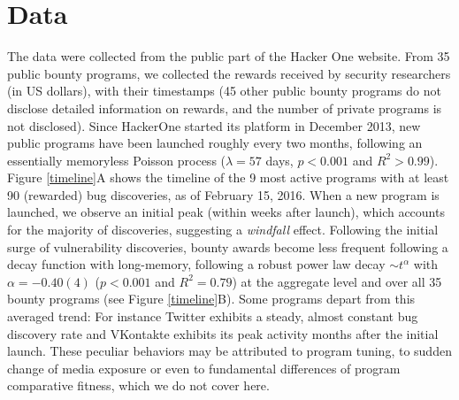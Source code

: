 \section{Data}
\label{sec:data}
The data were collected from the public part of the Hacker One website. From 35 public bounty programs, we collected the rewards received by security researchers (in US dollars), with their timestamps (45 other public bounty programs do not disclose detailed information on rewards, and the number of private programs is not disclosed). Since HackerOne started its platform in December 2013, new public programs have been launched roughly every two months, following an essentially memoryless Poisson process ($\lambda = 57$ days, $p < 0.001$ and $R^2 > 0.99$). Figure \ref{timeline}A shows the timeline of the 9 most active programs with at least 90 (rewarded) bug discoveries, as of February 15, 2016. When a new program is launched, we observe an initial peak (within weeks after launch), which accounts for the majority of discoveries, suggesting a {\it windfall} effect. Following the initial surge of vulnerability discoveries, bounty awards become less frequent following a decay function with long-memory, following a robust power law decay $\sim t^{\alpha}$ with $\alpha = -0.40(4)$ ($p < 0.001$ and $R^2 = 0.79$) at the aggregate level and over all 35 bounty programs (see Figure \ref{timeline}B). Some programs depart from this averaged trend: For instance Twitter exhibits a steady, almost constant bug discovery rate and VKontakte exhibits its peak activity months after the initial launch. These peculiar behaviors may be attributed to program tuning, to sudden change of media exposure or even to fundamental differences of program comparative fitness, which we do not cover here.\\

